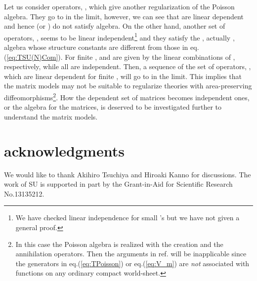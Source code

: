 \documentclass[a4paper,12pt]{article}
\providecommand{\bra}[1]{\langle\,#1\,|}
\providecommand{\ket}[1]{|\,#1\,\rangle}
\begin{document}
Let us consider \coordHE{} operators, \myHighlight{$V_{\bf m}^N \equiv\sum_{k,l=0}^{N-1}
W_{\bf m}^{kl}\,\ket{k}\bra{l}\quad (0\leq |m_a|\leq (N-1)/2)$}\coordHE{},
which give another regularization of the Poisson algebra. They go to
\coordHE{}  in the \coordHE{} limit, however, we can see
that \coordHE{} are linear dependent and hence \coordHE{} (or
\coordHE{}) do not satisfy \coordHE{} algebra.
On the other hand, another set of \coordHE{} operators,  \coordHE{}, seems to be linear
independent\footnote{We have checked linear independence for small
\coordHE{}'s but we have not given a general proof.} and they satisfy
the \coordHE{}, actually \coordHE{}, algebra whose structure constants are
different from those in eq.(\ref{eq:TSU(N)Com}). For finite \coordHE{},
\coordHE{} and \coordHE{} are given by the linear
combinations of \coordHE{},
respectively, while all \coordHE{} are independent.
Then, a sequence of the set of \coordHE{} operators,
\coordHE{}, which
are linear dependent for finite \coordHE{}, will go to \coordHE{} in the
\coordHE{} limit.
This implies that the \coordHE{} matrix models may not be suitable to
regularize theories with area-preserving diffeomorphisms\footnote{
In this case the Poisson algebra is realized with the creation
and the annihilation operators. Then the arguments in
ref.\cite{zunger} will be inapplicable since the generators in
eq.(\ref{eq:TPoisson}) or eq.(\ref{eq:V_m}) are {\it not} associated
with functions on any ordinary compact world-sheet.}.
How the dependent set of matrices becomes independent ones, or
the algebra for the \coordHE{} matrices, is deserved to be investigated
further to understand the matrix models.
\section*{acknowledgments}
We would like to thank Akihiro Tsuchiya and Hiroaki Kanno for
discussions. The work of SU is supported in part by the Grant-in-Aid
for Scientific Research No.13135212.
\end{document}
